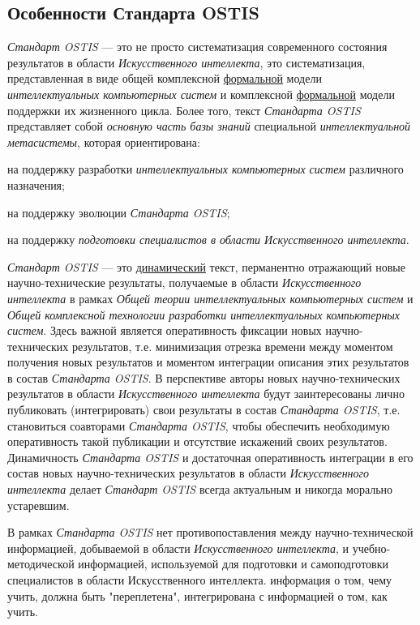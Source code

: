\subsection{Особенности Стандарта OSTIS}

\textit{Стандарт OSTIS} --- это не просто систематизация современного состояния результатов в области \textit{Искусственного интеллекта}, это систематизация, представленная в виде общей комплексной \uline{формальной} модели \textit{интеллектуальных компьютерных систем} и комплексной \uline{формальной} модели поддержки их жизненного цикла. Более того, текст \textit{Стандарта OSTIS} представляет собой \textit{основную часть базы знаний} специальной \textit{интеллектуальной метасистемы}, которая ориентирована:

\begin{textitemize}
	\item на поддержку разработки \textit{интеллектуальных компьютерных систем} различного назначения;
	\item на поддержку эволюции \textit{Стандарта OSTIS};
	\item на поддержку \textit{подготовки специалистов в области Искусственного интеллекта}.
\end{textitemize}

\textit{Стандарт OSTIS} --- это \uline{динамический} текст, перманентно отражающий новые научно-технические результаты, получаемые в области \textit{Искусственного интеллекта} в рамках \textit{Общей теории интеллектуальных компьютерных систем} и \textit{Общей комплексной технологии разработки интеллектуальных компьютерных систем}. Здесь важной является оперативность фиксации новых научно-технических результатов, т.е. минимизация отрезка времени между моментом получения новых результатов и моментом интеграции описания этих результатов в состав \textit{Стандарта OSTIS}. В перспективе авторы новых научно-технических результатов в области \textit{Искусственного интеллекта} будут заинтересованы лично публиковать (интегрировать) свои результаты в состав \textit{Стандарта OSTIS}, т.е. становиться соавторами \textit{Стандарта OSTIS}, чтобы обеспечить необходимую оперативность такой публикации и отсутствие искажений своих результатов. Динамичность \textit{Стандарта OSTIS} и достаточная оперативность интеграции в его состав новых научно-технических результатов в области \textit{Искусственного интеллекта} делает \textit{Стандарт OSTIS} всегда актуальным и никогда морально устаревшим.

В рамках \textit{Стандарта OSTIS} нет противопоставления между научно-технической информацией, добываемой в области \textit{Искусственного интеллекта}, и учебно-методической информацией, используемой для подготовки и самоподготовки специалистов в области Искусственного интеллекта. информация о том, чему учить, должна быть "переплетена"{}, интегрирована с информацией о том, как учить.

